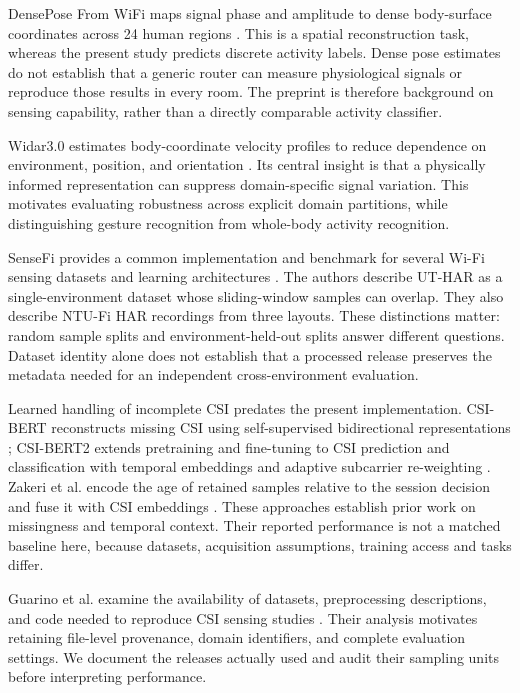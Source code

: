 \documentclass[a4paper,11pt,fleqn]{mira-author}
\begin{document}
DensePose From WiFi maps signal phase and amplitude to dense body-surface coordinates across 24 human regions \cite{geng2022}. This is a spatial reconstruction task, whereas the present study predicts discrete activity labels. Dense pose estimates do not establish that a generic router can measure physiological signals or reproduce those results in every room. The preprint is therefore background on sensing capability, rather than a directly comparable activity classifier.

Widar3.0 estimates body-coordinate velocity profiles to reduce dependence on environment, position, and orientation \cite{zheng2019}. Its central insight is that a physically informed representation can suppress domain-specific signal variation. This motivates evaluating robustness across explicit domain partitions, while distinguishing gesture recognition from whole-body activity recognition.

SenseFi provides a common implementation and benchmark for several Wi-Fi sensing datasets and learning architectures \cite{yang2023}. The authors describe UT-HAR as a single-environment dataset whose sliding-window samples can overlap. They also describe NTU-Fi HAR recordings from three layouts. These distinctions matter: random sample splits and environment-held-out splits answer different questions. Dataset identity alone does not establish that a processed release preserves the metadata needed for an independent cross-environment evaluation.

Learned handling of incomplete CSI predates the present implementation. CSI-BERT reconstructs missing CSI using self-supervised bidirectional representations \cite{zhao2024csibert}; CSI-BERT2 extends pretraining and fine-tuning to CSI prediction and classification with temporal embeddings and adaptive subcarrier re-weighting \cite{zhao2026csibert2}. Zakeri et al. encode the age of retained samples relative to the session decision and fuse it with CSI embeddings \cite{zakeri2026age}. These approaches establish prior work on missingness and temporal context. Their reported performance is not a matched baseline here, because datasets, acquisition assumptions, training access and tasks differ.

Guarino et al. examine the availability of datasets, preprocessing descriptions, and code needed to reproduce CSI sensing studies \cite{guarino2026}. Their analysis motivates retaining file-level provenance, domain identifiers, and complete evaluation settings. We document the releases actually used and audit their sampling units before interpreting performance.
\end{document}
